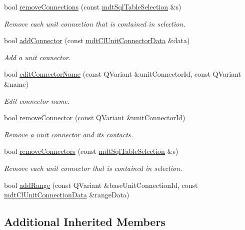 \begin{DoxyCompactItemize}
bool \hyperlink{classmdt_cl_unit_a003f76bd0eaac138d3d2c3e9bf25ef08}{remove\-Connections} (const \hyperlink{classmdt_sql_table_selection}{mdt\-Sql\-Table\-Selection} \&s)
\begin{DoxyCompactList}\small\item\em Remove each unit connection that is contained in selection. \end{DoxyCompactList}\item 
bool \hyperlink{classmdt_cl_unit_acafdba8ebc2f5044b096282ecc41da41}{add\-Connector} (const \hyperlink{classmdt_cl_unit_connector_data}{mdt\-Cl\-Unit\-Connector\-Data} \&data)
\begin{DoxyCompactList}\small\item\em Add a unit connector. \end{DoxyCompactList}\item 
bool \hyperlink{classmdt_cl_unit_a7bb1ff9cc5469f45dbf244fd26d60329}{edit\-Connector\-Name} (const Q\-Variant \&unit\-Connector\-Id, const Q\-Variant \&name)
\begin{DoxyCompactList}\small\item\em Edit connector name. \end{DoxyCompactList}\item 
bool \hyperlink{classmdt_cl_unit_a86244b8f9b2ff41c05b32749c038813d}{remove\-Connector} (const Q\-Variant \&unit\-Connector\-Id)
\begin{DoxyCompactList}\small\item\em Remove a unit connector and its contacts. \end{DoxyCompactList}\item 
bool \hyperlink{classmdt_cl_unit_ae898ad5a28b33cc5fcf501faca13df64}{remove\-Connectors} (const \hyperlink{classmdt_sql_table_selection}{mdt\-Sql\-Table\-Selection} \&s)
\begin{DoxyCompactList}\small\item\em Remove each unit connector that is contained in selection. \end{DoxyCompactList}\item 
bool \hyperlink{classmdt_cl_unit_a35a35f22daf4a408f5400031c12ce3cf}{add\-Range} (const Q\-Variant \&base\-Unit\-Connection\-Id, const \hyperlink{classmdt_cl_unit_connection_data}{mdt\-Cl\-Unit\-Connection\-Data} \&range\-Data)
\end{DoxyCompactItemize}
\subsection*{Additional Inherited Members}



